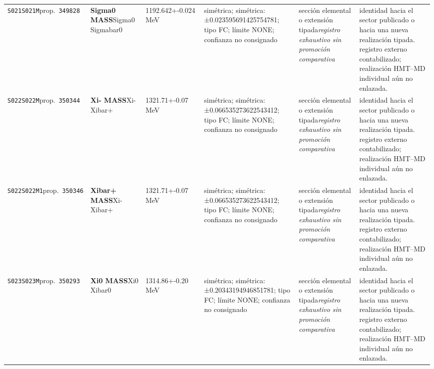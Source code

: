\begin{landscape}
\begin{longtable}{L{1.85cm}L{4.45cm}L{2.35cm}L{4.05cm}L{3.35cm}L{7.15cm}}
\texttt{S021}\newline \texttt{S021M}\newline prop.\ \texttt{349828} & \textbf{Sigma0 MASS}\newline Sigma0 \textbar{}\allowbreak{} Sigmabar0 & 1192.642+-0.024\,MeV & simétrica; simétrica: ±0.023595691425754781; tipo FC; límite NONE; confianza no consignado & sección elemental o extensión tipada\newline \emph{registro exhaustivo sin promoción comparativa} & identidad hacia el sector publicado o hacia una nueva realización tipada. registro externo contabilizado; realización HMT--MD individual aún no enlazada. \\
\texttt{S022}\newline \texttt{S022M}\newline prop.\ \texttt{350344} & \textbf{Xi- MASS}\newline Xi- \textbar{}\allowbreak{} Xibar+ & 1321.71+-0.07\,MeV & simétrica; simétrica: ±0.066535273622543412; tipo FC; límite NONE; confianza no consignado & sección elemental o extensión tipada\newline \emph{registro exhaustivo sin promoción comparativa} & identidad hacia el sector publicado o hacia una nueva realización tipada. registro externo contabilizado; realización HMT--MD individual aún no enlazada. \\
\texttt{S022}\newline \texttt{S022M1}\newline prop.\ \texttt{350346} & \textbf{Xibar+ MASS}\newline Xi- \textbar{}\allowbreak{} Xibar+ & 1321.71+-0.07\,MeV & simétrica; simétrica: ±0.066535273622543412; tipo FC; límite NONE; confianza no consignado & sección elemental o extensión tipada\newline \emph{registro exhaustivo sin promoción comparativa} & identidad hacia el sector publicado o hacia una nueva realización tipada. registro externo contabilizado; realización HMT--MD individual aún no enlazada. \\
\texttt{S023}\newline \texttt{S023M}\newline prop.\ \texttt{350293} & \textbf{Xi0 MASS}\newline Xi0 \textbar{}\allowbreak{} Xibar0 & 1314.86+-0.20\,MeV & simétrica; simétrica: ±0.20343194946851781; tipo FC; límite NONE; confianza no consignado & sección elemental o extensión tipada\newline \emph{registro exhaustivo sin promoción comparativa} & identidad hacia el sector publicado o hacia una nueva realización tipada. registro externo contabilizado; realización HMT--MD individual aún no enlazada. \\

\end{longtable}
\end{landscape}
